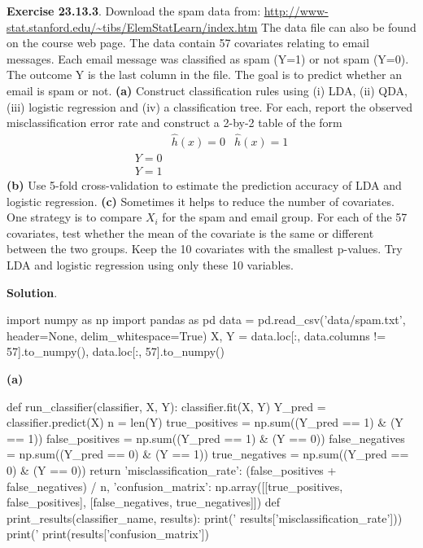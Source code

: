 \textbf{Exercise 23.13.3}. Download the spam data from:
\url{http://www-stat.stanford.edu/~tibs/ElemStatLearn/index.htm}
The data file can also be found on the course web page. The data contain
57 covariates relating to email messages. Each email message was
classified as spam (Y=1) or not spam (Y=0). The outcome Y is the last
column in the file. The goal is to predict whether an email is spam or
not.
\textbf{(a)} Construct classification rules using (i) LDA, (ii) QDA,
(iii) logistic regression and (iv) a classification tree. For each,
report the observed misclassification error rate and construct a 2-by-2
table of the form
\[
\begin{array}{c|cc}
 & \hat{h}(x) = 0 & \hat{h}(x) = 1 \\
\hline
Y = 0 \\
Y = 1
\end{array}
\]
\textbf{(b)} Use 5-fold cross-validation to estimate the prediction
accuracy of LDA and logistic regression.
\textbf{(c)} Sometimes it helps to reduce the number of covariates. One
strategy is to compare \(X_{i}\) for the spam and email group. For each of
the 57 covariates, test whether the mean of the covariate is the same or
different between the two groups. Keep the 10 covariates with the
smallest p-values. Try LDA and logistic regression using only these 10
variables.

\textbf{Solution}.

\begin{python}
import numpy as np
import pandas as pd
data = pd.read_csv('data/spam.txt', header=None, delim_whitespace=True)
X, Y = data.loc[:, data.columns != 57].to_numpy(), data.loc[:, 57].to_numpy()
\end{python}
\textbf{(a)}

\begin{python}
def run_classifier(classifier, X, Y):
    classifier.fit(X, Y)
    Y_pred = classifier.predict(X)
    n = len(Y)
    true_positives = np.sum((Y_pred == 1) & (Y == 1))
    false_positives = np.sum((Y_pred == 1) & (Y == 0))
    false_negatives = np.sum((Y_pred == 0) & (Y == 1))
    true_negatives = np.sum((Y_pred == 0) & (Y == 0))
    return {
        'misclassification_rate': (false_positives + false_negatives) / n,
        'confusion_matrix': np.array([[true_positives, false_positives], 
                                      [false_negatives, true_negatives]])
    }
def print_results(classifier_name, results):
    print('%
        results['misclassification_rate']))
    print('%
    print(results['confusion_matrix'])
\end{python}

